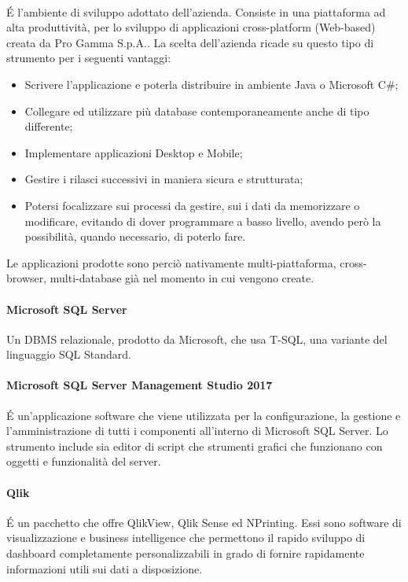 \paragraph{\inde} \'E l'ambiente di sviluppo adottato dell'azienda. Consiste in una piattaforma ad alta produttività, per lo sviluppo di applicazioni cross-platform (Web-based) creata da Pro Gamma S.p.A.. La scelta dell'azienda ricade su questo tipo di strumento per i seguenti vantaggi:
\begin{itemize}
	\item Scrivere l'applicazione e poterla distribuire in ambiente Java o Microsoft C\#;
	\item Collegare ed utilizzare più database contemporaneamente anche di tipo differente;
	\item Implementare applicazioni Desktop e Mobile;
	\item Gestire i rilasci successivi in maniera sicura e strutturata;
	\item Potersi focalizzare sui processi da gestire, sui i dati da memorizzare o modificare, evitando di dover programmare a basso livello, avendo però la possibilità, quando necessario, di poterlo fare.
\end{itemize}
Le applicazioni prodotte sono perciò nativamente multi-piattaforma, cross-browser, multi-database già nel momento in cui vengono create.

\paragraph{Microsoft SQL Server} Un DBMS relazionale, prodotto da Microsoft, che usa T-SQL, una variante del linguaggio SQL Standard. 

\paragraph{Microsoft SQL Server Management Studio 2017} \'E un'applicazione software che viene utilizzata per la configurazione, la gestione e l'amministrazione di tutti i componenti all'interno di Microsoft SQL Server. Lo strumento include sia editor di script che strumenti grafici che funzionano con oggetti e funzionalità del server.

\paragraph{Qlik}\'E un pacchetto che offre QlikView, Qlik Sense ed NPrinting. Essi sono software di visualizzazione e business intelligence che permettono il rapido sviluppo di dashboard completamente personalizzabili in grado di fornire rapidamente informazioni utili sui dati a disposizione.

